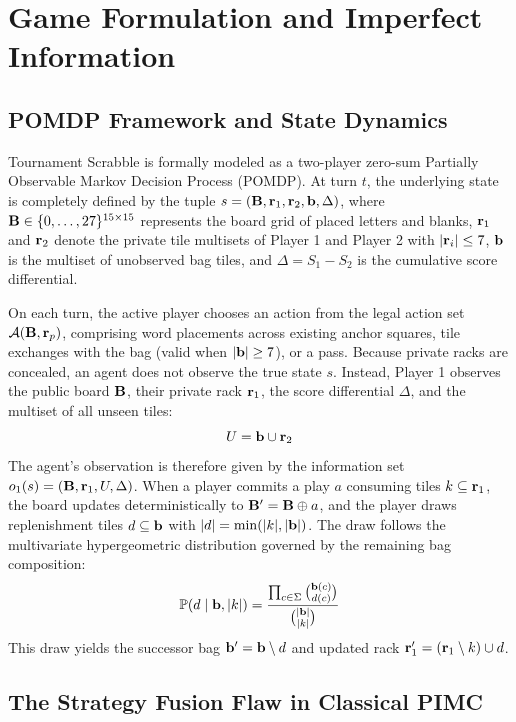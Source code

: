 \section{Game Formulation and Imperfect Information}
\label{sec:game_formulation}

\subsection{POMDP Framework and State Dynamics}

Tournament Scrabble is formally modeled as a two-player zero-sum Partially Observable Markov Decision Process (POMDP). At turn $t$, the underlying state is completely defined by the tuple $s = (\mathbf{B}, \mathbf{r}_1, \mathbf{r}_2, \mathbf{b}, \Delta)$, where $\mathbf{B} \in \{0, \dots, 27\}^{15 \times 15}$ represents the board grid of placed letters and blanks, $\mathbf{r}_1$ and $\mathbf{r}_2$ denote the private tile multisets of Player 1 and Player 2 with $|\mathbf{r}_i| \le 7$, $\mathbf{b}$ is the multiset of unobserved bag tiles, and $\Delta = S_1 - S_2$ is the cumulative score differential.

On each turn, the active player chooses an action from the legal action set $\mathcal{A}(\mathbf{B}, \mathbf{r}_p)$, comprising word placements across existing anchor squares, tile exchanges with the bag (valid when $|\mathbf{b}| \ge 7$), or a pass. Because private racks are concealed, an agent does not observe the true state $s$. Instead, Player 1 observes the public board $\mathbf{B}$, their private rack $\mathbf{r}_1$, the score differential $\Delta$, and the multiset of all unseen tiles:
\begin{equation}
    U = \mathbf{b} \cup \mathbf{r}_2
\end{equation}
The agent's observation is therefore given by the information set $o_1(s) = (\mathbf{B}, \mathbf{r}_1, U, \Delta)$. When a player commits a play $a$ consuming tiles $k \subseteq \mathbf{r}_1$, the board updates deterministically to $\mathbf{B}' = \mathbf{B} \oplus a$, and the player draws replenishment tiles $d \subseteq \mathbf{b}$ with $|d| = \min(|k|, |\mathbf{b}|)$. The draw follows the multivariate hypergeometric distribution governed by the remaining bag composition:
\begin{equation}
    \mathbb{P}(d \mid \mathbf{b}, |k|) = \frac{\prod_{c \in \Sigma} \binom{\mathbf{b}(c)}{d(c)}}{\binom{|\mathbf{b}|}{|k|}}
\end{equation}
This draw yields the successor bag $\mathbf{b}' = \mathbf{b} \setminus d$ and updated rack $\mathbf{r}_1' = (\mathbf{r}_1 \setminus k) \cup d$.

\subsection{The Strategy Fusion Flaw in Classical PIMC}

